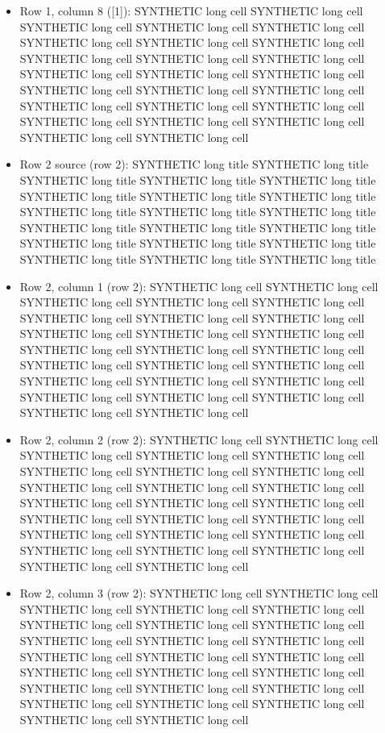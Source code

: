 \documentclass[journal]{IEEEtran}
\begin{document}
\begin{itemize}
\item[10.] Row 1, column 8 ([1]): SYNTHETIC long cell SYNTHETIC long cell SYNTHETIC long cell SYNTHETIC long cell SYNTHETIC long cell SYNTHETIC long cell SYNTHETIC long cell SYNTHETIC long cell SYNTHETIC long cell SYNTHETIC long cell SYNTHETIC long cell SYNTHETIC long cell SYNTHETIC long cell SYNTHETIC long cell SYNTHETIC long cell SYNTHETIC long cell SYNTHETIC long cell SYNTHETIC long cell SYNTHETIC long cell SYNTHETIC long cell SYNTHETIC long cell SYNTHETIC long cell SYNTHETIC long cell SYNTHETIC long cell SYNTHETIC long cell
\item[11.] Row 2 source (row 2): SYNTHETIC long title SYNTHETIC long title SYNTHETIC long title SYNTHETIC long title SYNTHETIC long title SYNTHETIC long title SYNTHETIC long title SYNTHETIC long title SYNTHETIC long title SYNTHETIC long title SYNTHETIC long title SYNTHETIC long title SYNTHETIC long title SYNTHETIC long title SYNTHETIC long title SYNTHETIC long title SYNTHETIC long title SYNTHETIC long title SYNTHETIC long title SYNTHETIC long title
\item[12.] Row 2, column 1 (row 2): SYNTHETIC long cell SYNTHETIC long cell SYNTHETIC long cell SYNTHETIC long cell SYNTHETIC long cell SYNTHETIC long cell SYNTHETIC long cell SYNTHETIC long cell SYNTHETIC long cell SYNTHETIC long cell SYNTHETIC long cell SYNTHETIC long cell SYNTHETIC long cell SYNTHETIC long cell SYNTHETIC long cell SYNTHETIC long cell SYNTHETIC long cell SYNTHETIC long cell SYNTHETIC long cell SYNTHETIC long cell SYNTHETIC long cell SYNTHETIC long cell SYNTHETIC long cell SYNTHETIC long cell SYNTHETIC long cell
\item[13.] Row 2, column 2 (row 2): SYNTHETIC long cell SYNTHETIC long cell SYNTHETIC long cell SYNTHETIC long cell SYNTHETIC long cell SYNTHETIC long cell SYNTHETIC long cell SYNTHETIC long cell SYNTHETIC long cell SYNTHETIC long cell SYNTHETIC long cell SYNTHETIC long cell SYNTHETIC long cell SYNTHETIC long cell SYNTHETIC long cell SYNTHETIC long cell SYNTHETIC long cell SYNTHETIC long cell SYNTHETIC long cell SYNTHETIC long cell SYNTHETIC long cell SYNTHETIC long cell SYNTHETIC long cell SYNTHETIC long cell SYNTHETIC long cell
\item[14.] Row 2, column 3 (row 2): SYNTHETIC long cell SYNTHETIC long cell SYNTHETIC long cell SYNTHETIC long cell SYNTHETIC long cell SYNTHETIC long cell SYNTHETIC long cell SYNTHETIC long cell SYNTHETIC long cell SYNTHETIC long cell SYNTHETIC long cell SYNTHETIC long cell SYNTHETIC long cell SYNTHETIC long cell SYNTHETIC long cell SYNTHETIC long cell SYNTHETIC long cell SYNTHETIC long cell SYNTHETIC long cell SYNTHETIC long cell SYNTHETIC long cell SYNTHETIC long cell SYNTHETIC long cell SYNTHETIC long cell SYNTHETIC long cell

\end{itemize}
\end{document}
